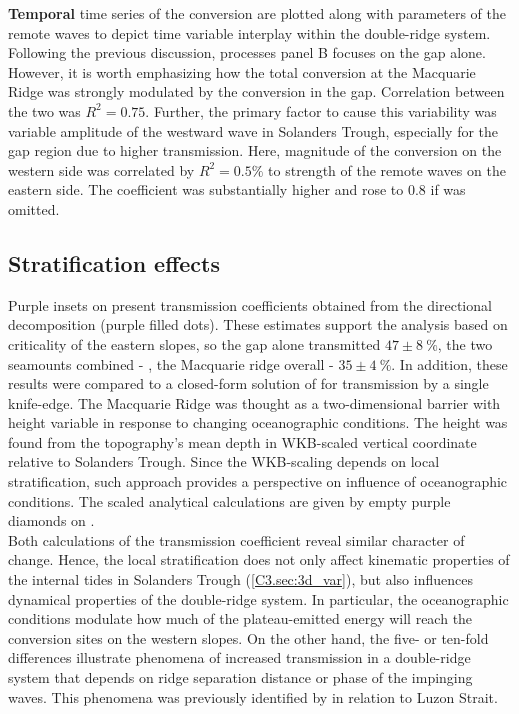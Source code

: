 \documentclass[12pt]{article}
\begin{document}
\textbf{Temporal} time series of the conversion are plotted along 
with parameters of the remote waves to depict time variable interplay 
within the double-ridge system. Following the previous discussion, processes panel B focuses on the 
gap alone. However, it is worth emphasizing how the total conversion at the Macquarie Ridge 
was strongly modulated by the conversion in the gap. Correlation between the 
two was $R^2 = 0.75$. Further, the primary factor to cause this variability was variable amplitude 
of the westward wave in Solanders Trough, especially for the gap region 
 due to higher transmission. Here, magnitude of the conversion on the 
western side was correlated by $R^2 = 0.5\%$ to strength of the remote waves on the eastern side. 
The coefficient was substantially higher and rose to $0.8$ if  was omitted.\\

\subsection{Stratification effects}
Purple insets on  present transmission coefficients 
obtained from the directional decomposition (purple filled dots). These estimates support the 
analysis based on 
criticality of the eastern slopes, so the gap alone transmitted $47 \pm 8~\%$, the two seamounts 
combined - , the Macquarie ridge overall 
- $35 \pm 4~\%$. In addition, these results were compared to a closed-form solution of 
\citep{larsen1969internal} for transmission by a single knife-edge. The Macquarie Ridge was thought 
as a two-dimensional barrier with height variable in response to changing oceanographic conditions. 
The height 
was found from the topography's mean depth in WKB-scaled vertical coordinate 
\citep{althaus2003internal} relative to Solanders Trough. Since the WKB-scaling depends on local 
stratification, such approach provides a perspective on influence of 
oceanographic conditions. The scaled analytical calculations are given by empty purple diamonds on 
.\\

Both calculations of the transmission coefficient reveal similar character of change. Hence, the 
local stratification does not only affect kinematic properties of the internal tides in Solanders 
Trough (\ref{C3.sec:3d_var}), but also influences dynamical properties of the double-ridge system. 
In particular, the oceanographic conditions modulate how much of the plateau-emitted energy will 
reach the conversion sites on the western slopes. On the other hand, the five- or ten-fold 
differences illustrate phenomena of increased transmission in a double-ridge system that depends 
on ridge separation distance or phase of the impinging waves. This phenomena was previously 
identified by \citep{klymak2013parameterizing} in relation to Luzon Strait.\\
\end{document}
